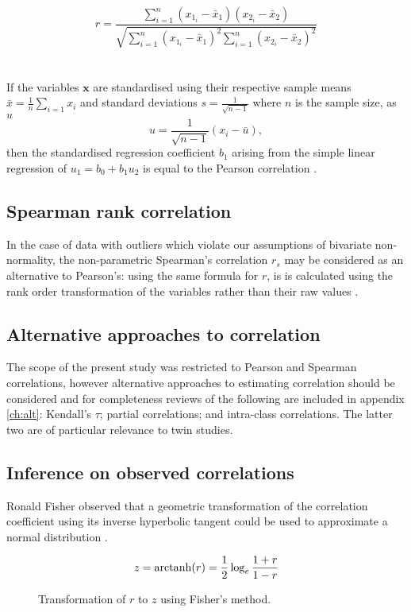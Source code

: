 $$r = \frac{\sum_{i=1}^n (x_{1_i} - \bar{x}_1)(x_{2_i} - \bar{x}_2)}{\sqrt{\sum_{i=1}^n (x_{1_i} - \bar{x}_1)^2 \sum_{i=1}^n (x_{2_i} - \bar{x}_2)^2}}$$
\\
\\
If the variables $\boldsymbol{x}$ are standardised using their respective sample means ${\bar{x}} = \frac{1}{n}\sum_{i=1}x_i$ and standard deviations $s = \frac{1}{\sqrt{n-1}}$ where $n$ is the sample size, as $u$
$$u = \frac{1}{\sqrt{n-1}}(x_i - \bar{u}),$$
then the standardised regression coefficient $b_1$ arising from the simple linear regression of $u_1 = b_0 + b_1 u_2$ is equal to the Pearson correlation \cite{Tu2012}.  

\subsection{Spearman rank correlation}
 In the case of data with outliers which violate our assumptions of bivariate non-normality, the non-parametric Spearman's correlation $r_s$ may be considered as an alternative to Pearson's: using the same formula for $r$, is is calculated using the rank order transformation of the variables rather than their raw values \cite{Fieller1957,StataCorp2013}. 

\subsection{Alternative approaches to correlation}
The scope of the present study was restricted to Pearson and Spearman correlations, however alternative approaches to estimating correlation should be considered and for completeness reviews of the following are included in appendix \ref{ch:alt}: Kendall's $\tau$; partial correlations; and intra-class correlations.  The latter two are of particular relevance to twin studies.

\subsection{Inference on observed correlations}
Ronald Fisher observed that a geometric transformation of the correlation coefficient using its inverse hyperbolic tangent could be used to approximate a normal distribution \cite{Fisher1915}.  

$$z = \operatorname{arctanh}(r) = \frac{1}{2} \log_e \frac{1+r}{1-r}$$

\begin{figure}[htbp]
\sidecaption[t]
{}
\caption{Transformation of $r$ to $z$ using Fisher's method.}
\label{fig:ztransform}       %
\end{figure}

